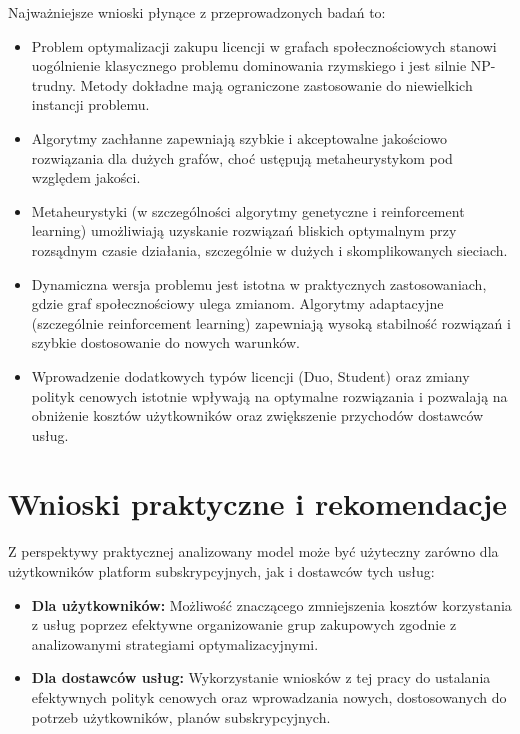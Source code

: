 Najważniejsze wnioski płynące z przeprowadzonych badań to:

\begin{itemize}
    \item Problem optymalizacji zakupu licencji w grafach społecznościowych stanowi uogólnienie klasycznego problemu dominowania rzymskiego i jest silnie NP-trudny. Metody dokładne mają ograniczone zastosowanie do niewielkich instancji problemu.
    \item Algorytmy zachłanne zapewniają szybkie i akceptowalne jakościowo rozwiązania dla dużych grafów, choć ustępują metaheurystykom pod względem jakości.
    \item Metaheurystyki (w szczególności algorytmy genetyczne i reinforcement learning) umożliwiają uzyskanie rozwiązań bliskich optymalnym przy rozsądnym czasie działania, szczególnie w dużych i skomplikowanych sieciach.
    \item Dynamiczna wersja problemu jest istotna w praktycznych zastosowaniach, gdzie graf społecznościowy ulega zmianom. Algorytmy adaptacyjne (szczególnie reinforcement learning) zapewniają wysoką stabilność rozwiązań i szybkie dostosowanie do nowych warunków.
    \item Wprowadzenie dodatkowych typów licencji (Duo, Student) oraz zmiany polityk cenowych istotnie wpływają na optymalne rozwiązania i pozwalają na obniżenie kosztów użytkowników oraz zwiększenie przychodów dostawców usług.
\end{itemize}

\section{Wnioski praktyczne i rekomendacje}

Z perspektywy praktycznej analizowany model może być użyteczny zarówno dla użytkowników platform subskrypcyjnych, jak i dostawców tych usług:

\begin{itemize}
    \item \textbf{Dla użytkowników:} Możliwość znaczącego zmniejszenia kosztów korzystania z usług poprzez efektywne organizowanie grup zakupowych zgodnie z analizowanymi strategiami optymalizacyjnymi.
    \item \textbf{Dla dostawców usług:} Wykorzystanie wniosków z tej pracy do ustalania efektywnych polityk cenowych oraz wprowadzania nowych, dostosowanych do potrzeb użytkowników, planów subskrypcyjnych.
\end{itemize}

